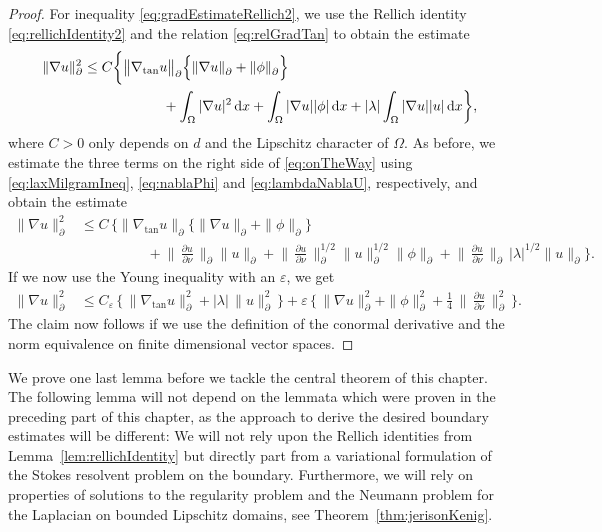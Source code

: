 \begin{proof}
  For inequality \eqref{eq:gradEstimateRellich2}, we use the Rellich identity \eqref{eq:rellichIdentity2} and the relation \eqref{eq:relGradTan} to obtain the estimate
  \begin{align}
    \label{eq:onTheWay}
    \begin{alignedat}{1}
    \| \nabla u\|_\partial^2 
    &\leq C \bigg\{ \big\|\nabla_{\mathrm{tan}} u\big\|^{}_\partial 
    \Big\{ \|\nabla u\|^{}_\partial + \|\phi\|^{}_\partial \Big\}   \\
    &\hspace{2cm} + \int_\Omega |\nabla u|^2 \, {\operatorname{d}\!{x}} + \int_\Omega |\nabla u| |\phi| \, {\operatorname{d}\!{x}} + |\lambda| \int_\Omega |\nabla u| |u|\, {\operatorname{d}\!{x}} \bigg\},
  \end{alignedat}
  \end{align}
  where $C > 0$ only depends on $d$ and the Lipschitz character of $\Omega$.
  As before, we estimate the three terms on the right side of \eqref{eq:onTheWay} using \eqref{eq:laxMilgramIneq}, \eqref{eq:nablaPhi} and \eqref{eq:lambdaNablaU}, respectively, and obtain the estimate
  \begin{align*}
    \| \nabla u\|_\partial^2 
    &\leq C\, \bigg\{ \big\|\nabla_{\mathrm{tan}} u\big\|^{}_\partial 
    \Big\{ \|\nabla u\|^{}_\partial + \|\phi\|^{}_\partial \Big\}   \\
    &\hspace{2cm} + \Big\|\, \frac{\partial u}{\partial \nu} \, \Big\|^{}_\partial \| u\|^{}_\partial
+ \Big\|\, \frac{\partial u}{\partial \nu} \, \Big\|_\partial^{1/2} \|u\|_\partial^{1/2} \|\phi\|^{}_\partial + \Big\|\, \frac{\partial u}{\partial \nu} \,\Big\|^{}_\partial \, |\lambda|^{1/2} \big\| u  \big\|^{}_\partial \bigg\}.
  \end{align*}
  If we now use the Young inequality with an $\varepsilon$, we get
  \begin{align*}
    \|\nabla u\|_\partial^2 
    &\leq C_\varepsilon\, \Big\{ \, \|\nabla_{\mathrm{tan}} u\|_\partial^2 + |\lambda|\, \| u\|_\partial^2 \, \Big\}  + \varepsilon\, \bigg\{ \, \|\nabla u\|_\partial^2 + \|\phi\|_\partial^2 + \frac{1}{4}\,\Big\|\,\frac{\partial u}{\partial \nu} \, \Big\|_\partial^2 \, \bigg\}.
  \end{align*}
  The claim now follows if we use the definition of the conormal derivative and the norm equivalence on finite dimensional vector spaces.
\end{proof}

We prove one last lemma before we tackle the central theorem of this chapter.
The following lemma will not depend on the lemmata which were proven in the preceding part of this chapter, as the approach to derive the desired boundary estimates will be different:
We will not rely upon the Rellich identities from Lemma~\ref{lem:rellichIdentity} but directly part from a variational formulation of the Stokes resolvent problem on the boundary. 
Furthermore, we will rely on properties of solutions to the regularity problem and the Neumann problem for the Laplacian on bounded Lipschitz domains, see Theorem~\ref{thm:jerisonKenig}.

